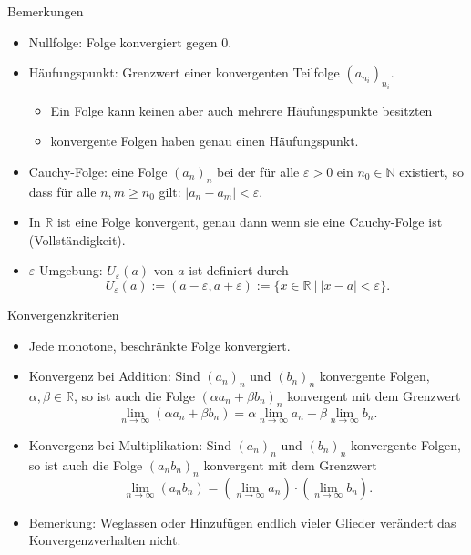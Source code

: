 \documentclass[notes=hide,hyperref={dvipdfmx,pdfpagelabels=false}]{beamer}
\begin{document}
\begin{frame}{Bemerkungen}
\begin{itemize}
\item \alert{Nullfolge}: Folge konvergiert gegen $0$.
\item {\color{red} Häufungspunkt}: Grenzwert einer konvergenten Teilfolge $(a_{n_i})_{n_i}$.
\begin{itemize}
\item Ein Folge kann keinen aber auch mehrere Häufungspunkte besitzten
\item konvergente Folgen haben genau einen Häufungspunkt.
\end{itemize}
\item  {\color{red} Cauchy-Folge}: eine Folge $(a_n)_n$ bei der für
alle $\varepsilon>0$ ein $n_0 \in \mathbb{N}$ existiert, so dass für alle
$n,m \geq n_0$ gilt:
$|a_n - a_m| < \varepsilon$. \\
\item In $\mathbb{R}$ ist eine Folge konvergent,
genau dann wenn sie eine Cauchy-Folge ist (Vollständigkeit).
\item {\color{red} $\varepsilon$-Umgebung}: $U_\varepsilon(a)$ von $a$ ist
definiert durch
\[
U_\varepsilon(a) := (a-\varepsilon, a+\varepsilon) := \{ x \in \mathbb{R} \ | \ |x - a| < \varepsilon \}.
\] 
\end{itemize}
\end{frame}




\begin{frame}{Konvergenzkriterien}
\begin{itemize}
\item Jede monotone, beschränkte Folge konvergiert.
\item Konvergenz bei Addition: Sind $(a_n)_n$ und $(b_n)_n$ konvergente Folgen, $\alpha, \beta \in \mathbb{R}$, so ist auch die
                   Folge $( \alpha a_n+\beta b_n)_n$ konvergent mit
                   dem Grenzwert
 \[ \lim_{n \rightarrow \infty} ( \alpha a_n + \beta b_n)= \alpha
                   \lim_{n \rightarrow \infty} a_n + \beta \lim_{n
                   \rightarrow \infty} b_n .\]
\item Konvergenz bei Multiplikation: Sind $(a_n)_n$ und $(b_n)_n$ konvergente Folgen, so ist auch die
                   Folge $(a_n b_n)_n$ konvergent mit
                   dem Grenzwert
 \[
  \lim_{n \rightarrow \infty} ( a_n b_n)= 
                   (\lim_{n \rightarrow \infty} a_n) \cdot  (\lim_{n
                   \rightarrow \infty} b_n).
 \]
\item Bemerkung: Weglassen oder Hinzufügen endlich vieler Glieder verändert das
                   Konvergenzverhalten nicht.
\end{itemize}
\end{frame}
\end{document}
